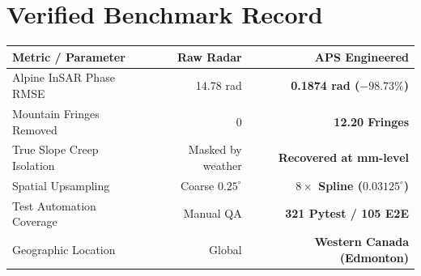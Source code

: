 \documentclass[10pt,letterpaper]{article}
\begin{document}
\begin{minipage}[t]{0.51\textwidth}
    \section*{Verified Benchmark Record}
    \footnotesize
    \begin{tabularx}{\linewidth}{X r r}
        \toprule
        \textbf{Metric / Parameter} & \textbf{Raw Radar} & \textbf{APS Engineered} \\
        \midrule
        Alpine InSAR Phase RMSE & 14.78 rad & \textbf{0.1874 rad ($-98.73\%$)} \\
        Mountain Fringes Removed & 0 & \textbf{12.20 Fringes} \\
        True Slope Creep Isolation & Masked by weather & \textbf{Recovered at mm-level} \\
        Spatial Upsampling & Coarse $0.25^\circ$ & \textbf{$8\times$ Spline ($0.03125^\circ$)} \\
        Test Automation Coverage & Manual QA & \textbf{321 Pytest / 105 E2E} \\
        Geographic Location & Global & \textbf{Western Canada (Edmonton)} \\
        \bottomrule
    \end{tabularx}
\end{minipage}
\hfill
\end{document}
